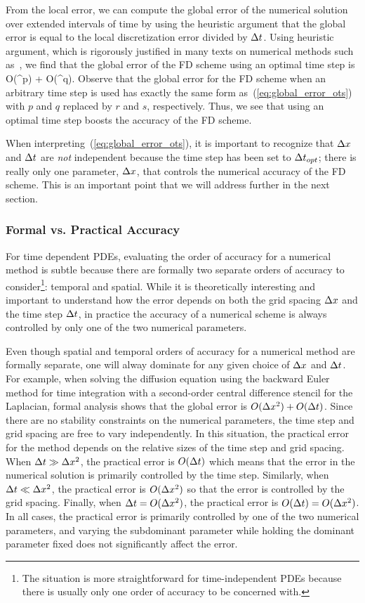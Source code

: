 \documentclass[oneeqnum,onefignum,onetabnum,onethmnum]{siamltex}
\begin{document}
From the local error, we can compute the global error of the numerical 
solution over extended intervals of time by using the heuristic argument
that the global error is equal to the local discretization 
error divided by $\Delta t$.  Using heuristic argument, which is rigorously 
justified in many texts on numerical methods such as~\cite{gko_book}, we 
find that the global error of the FD scheme using an optimal time step is 
\beq
O(\dx^p) + O(\dt^q).
\label{eq:global_error_ots}
\eeq
Observe that the global error for the FD scheme when an arbitrary time
step is used has exactly the same form as~(\ref{eq:global_error_ots}) with
$p$ and $q$ replaced by $r$ and $s$, respectively.  Thus, we see that 
using an optimal time step boosts the accuracy of the FD scheme.  

When interpreting~(\ref{eq:global_error_ots}), it is important to recognize
that $\Delta x$ and $\Delta t$ are \emph{not} independent because the time 
step has been set to $\Delta t_{opt}$; there is really only one parameter, 
$\Delta x$, that controls the numerical accuracy of the FD scheme.  This is an 
important point that we will address further in the next section.


\subsubsection*{Formal vs. Practical Accuracy}
For time dependent PDEs, evaluating the order of accuracy for a numerical
method is subtle because there are formally two separate orders of accuracy 
to consider\footnote{The situation is more straightforward for 
time-independent PDEs because there is usually only one order of accuracy to 
be concerned with.}:  temporal and spatial.  While it is theoretically
interesting and important to understand how the error depends on both the 
grid spacing $\Delta x$ and the time step $\Delta t$, in practice the accuracy 
of a numerical scheme is always controlled by only one of the two numerical
parameters.  

Even though spatial and temporal orders of accuracy for a numerical method
are formally separate, one will alway dominate for any given choice of 
$\Delta x$ and $\Delta t$.  For example, when solving the diffusion  equation 
using the backward Euler method for time integration with a second-order 
central difference stencil for the Laplacian, formal analysis shows that 
the global error is $O(\Delta x^2) + O(\Delta t)$.  Since there are no 
stability constraints on the numerical parameters, the time
step and grid spacing are free to vary independently.  In this situation, the 
practical error for the method depends on the relative sizes of the time step 
and grid spacing.  When $\Delta t \gg \Delta x^2$, the practical error is 
$O(\Delta t)$ which means that the error in the numerical solution is 
primarily controlled by the time step.  Similarly, when 
$\Delta t \ll \Delta x^2$, the practical error is $O(\Delta x^2)$ so that 
the error is controlled by the grid spacing.  Finally, when 
$\Delta t  = O(\Delta x^2)$, the practical error is 
$O(\Delta t) = O(\Delta x^2)$.  In all cases, the practical error is 
primarily controlled by one of the two numerical parameters, and varying
the subdominant parameter while holding the dominant parameter fixed does 
not significantly affect the error.
 
\end{document}
